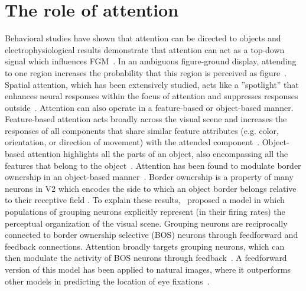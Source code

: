 \section{The role of attention}
Behavioral studies have shown that attention can be directed to objects \citep{Egly_etal94} and electrophysiological results demonstrate that attention can act as a top-down signal which influences FGM~\citep{Qiu_etal07,  Poort_etal12}. In an ambiguous figure-ground display, attending to one region increases the probability that this region is perceived as figure~\citep{Driver_Baylis96, Vecera_etal04}. Spatial attention, which has been extensively studied, acts like a ''spotlight'' that enhances neural responses within the focus of attention and suppresses responses outside~\citep{Motter93a}. Attention can also operate in a feature-based or object-based manner. Feature-based attention acts broadly across the visual scene and increases the responses of all components that share similar feature attributes (e.g. color, orientation, or direction of movement) with the attended component~\citep{Treue_Trujillo99}. Object-based attention highlights all the parts of an object, also encompassing all the features that belong to the object~\citep{Roelfsema_etal98, Schoenfeld_etal14}.
Attention has been found to modulate border ownership in an object-based manner~\citep{Qiu_etal07}. Border ownership is a property of many neurons in V2 which encodes the side to which an object border
belongs relative to their receptive field \citep{Zhou_etal00}. To explain these results,~\citet{Craft_etal07} proposed a model in which populations of grouping neurons explicitly represent (in their firing rates) the perceptual organization of the visual scene. Grouping neurons are reciprocally connected to border ownership selective (BOS) neurons through feedforward and feedback connections. Attention broadly
targets grouping neurons, which can then modulate the activity of BOS
neurons through feedback~\citep{Mihalas_etal11b}. A feedforward version of this model has been applied to natural images, where it outperforms other models in predicting the location of eye
fixations~\citep{Russell_etal14}.

